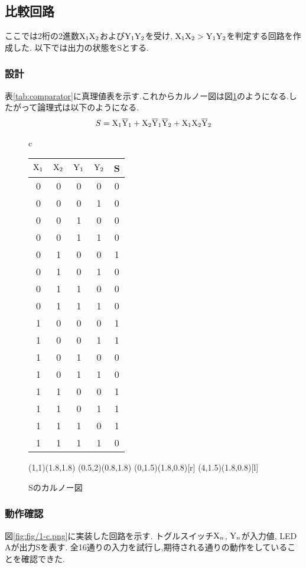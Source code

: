 \subsection{比較回路}
ここでは2桁の2進数${\rm X}_1{\rm X}_2$および${\rm Y}_1{\rm Y}_2$を受け,
${\rm X}_1{\rm X}_2>{\rm Y}_1{\rm Y}_2$を判定する回路を作成した.
以下では出力の状態をSとする.
\subsubsection{設計}
表\ref{tab:comparator}に真理値表を示す.これからカルノー図は図\ref{fig:karnaugh1c}のようになる.したがって論理式は以下のようになる.
\begin{align}
  S={\rm X}_1{\rm\overline{Y}}_1+{\rm X}_2{\rm\overline{Y}}_1{\rm\overline{Y}}_2+{\rm X}_1{\rm X}_2{\rm\overline{Y}}_2
\end{align}
\begin{figure}[h]
  \begin{tabular}{c}
    \begin{minipage}[t]{.48\textwidth}
      \centering
      \begin{tabular}{cccc|c}
        \hline
        ${\rm X}_1$ & ${\rm X}_2$ & ${\rm Y}_1$ & ${\rm Y}_2$ & S\\
        \hline
        0 & 0 & 0 & 0 & 0 \\
        0 & 0 & 0 & 1 & 0 \\
        0 & 0 & 1 & 0 & 0 \\
        0 & 0 & 1 & 1 & 0 \\
        0 & 1 & 0 & 0 & 1 \\
        0 & 1 & 0 & 1 & 0 \\
        0 & 1 & 1 & 0 & 0 \\
        0 & 1 & 1 & 1 & 0 \\
        1 & 0 & 0 & 0 & 1 \\
        1 & 0 & 0 & 1 & 1 \\
        1 & 0 & 1 & 0 & 0 \\
        1 & 0 & 1 & 1 & 0 \\
        1 & 1 & 0 & 0 & 1 \\
        1 & 1 & 0 & 1 & 1 \\
        1 & 1 & 1 & 0 & 1 \\
        1 & 1 & 1 & 1 & 0 \\
        \hline
      \end{tabular}
      \label{tab:comparator}
    \end{minipage}
    \hfill
    \begin{minipage}[c]{.48\textwidth}
      \centering
      {%
      \color{red}\put(1,1){\oval(1.8,1.8)}
      \color{green}\put(0.5,2){\oval(0.8,1.8)}
      \color{blue}\put(0,1.5){\oval(1.8,0.8)[r]}
      \color{blue}\put(4,1.5){\oval(1.8,0.8)[l]}
      }
      \caption{Sのカルノー図}
      \label{fig:karnaugh1c}
    \end{minipage}
  \end{tabular}
\end{figure}
\clearpage
\subsubsection{動作確認}
図\ref{fig:fig/1-c.png}に実装した回路を示す.
トグルスイッチ${\rm X}_n$, ${\rm Y}_n$が入力値,
LED Aが出力Sを表す.
全16通りの入力を試行し,期待される通りの動作をしていることを確認できた.
